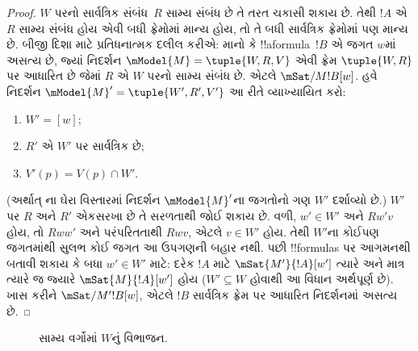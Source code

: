 \documentclass[../../../include/open-logic-section]{subfiles}
\begin{document}
\begin{proof}
  $W$ પરનો સાર્વત્રિક સંબંધ~$R$ સામ્ય સંબંધ છે
  તે તરત ચકાસી શકાય છે. તેથી $!A$ એ $R$ સામ્ય
  સંબંધ હોય એવી બધી ફ્રેમોમાં માન્ય હોય, તો તે
  બધી સાર્વત્રિક ફ્રેમોમાં પણ માન્ય છે. બીજી
  દિશા માટે પ્રતિધનાત્મક દલીલ કરીએ: માનો કે
  !!a{formula}~$!B$ એ જગત $w$માં અસત્ય છે,
  જ્યાં નિદર્શન $\mModel{M} = \tuple{W, R, V}$
  એવી ફ્રેમ $\tuple{W,R}$ પર આધારિત છે જેમાં $R$
  એ $W$ પરનો સામ્ય સંબંધ છે. એટલે
  $\mSat/{M}{!B}[w]$. હવે નિદર્શન
  $\mModel{M}' = \tuple{W',
    R', V'}$ આ રીતે વ્યાખ્યાયિત કરો:
  \begin{enumerate}
  \item $W' = [w]$;
  \item $R'$ એ $W'$ પર સાર્વત્રિક છે;
  \item $V'(p) = V(p) \cap W'$.
  \end{enumerate}
  (અર્થાત્ ના ઘેરા વિસ્તારમાં
  નિદર્શન $\mModel{M}'$ના જગતોનો ગણ $W'$
  દર્શાવ્યો છે.) $W'$ પર $R$ અને $R'$ એકસરખા
  છે તે સરળતાથી જોઈ શકાય છે. વળી, $w'\in W'$ અને
  $Rw'v$ હોય, તો $Rww'$ અને પરંપરિતતાથી $Rwv$,
  એટલે $v\in W'$ હોય. તેથી $W'$ના કોઈપણ જગતમાંથી
  સુલભ કોઈ જગત આ ઉપગણની બહાર નથી. પછી !!{formula}s
  પર આગમનથી બતાવી શકાય કે બધા $w' \in W'$ માટે:
  દરેક $!A$ માટે $\mSat{M'}{!A}[w']$ ત્યારે અને
  માત્ર ત્યારે જ જ્યારે $\mSat{M}{!A}[w']$ હોય
  ($W'
  \subseteq W$ હોવાથી આ વિધાન અર્થપૂર્ણ છે).
  ખાસ કરીને $\mSat/{M'}{!B}[w]$, એટલે $!B$
  સાર્વત્રિક ફ્રેમ પર આધારિત નિદર્શનમાં અસત્ય છે.
\end{proof}

\begin{figure}[t]
  \centering
  \caption{સામ્ય વર્ગોમાં $W$નું વિભાજન.}
\end{figure}
\end{document}

